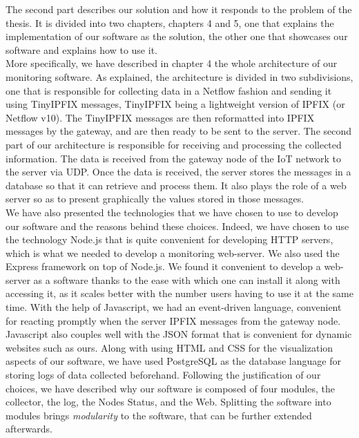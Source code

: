 The second part describes our solution and how it responds to the problem of the thesis. It is divided into two chapters, chapters 4 and 5, one that explains the implementation of our software as the solution, the other one that showcases our software and explains how to use it.\\

More specifically, we have described in chapter 4 the whole architecture of our monitoring software. As explained, the architecture is divided in two subdivisions, one that is responsible for collecting data in a Netflow fashion and sending it using TinyIPFIX messages, TinyIPFIX being a lightweight version of IPFIX (or Netflow v10). The TinyIPFIX messages are then reformatted into IPFIX messages by the gateway, and are then ready to be sent to the server. The second part of our architecture is responsible for receiving and processing the collected information. The data is received from the gateway node of the IoT network to the server via UDP. Once the data is received, the server stores the messages in a database so that it can retrieve and process them. It also plays the role of a web server so as to present graphically the values stored in those messages. \\

We have also presented the technologies that we have chosen to use to develop our software and the reasons behind these choices. Indeed, we have chosen to use the technology Node.js that is quite convenient for developing HTTP servers, which is what we needed to develop a monitoring web-server. We also used the Express framework on top of Node.js. We found it convenient to develop a web-server as a software thanks to the ease with which one can install it along with accessing it, as it scales better with the number users having to use it at the same time. With the help of Javascript, we had an event-driven language, convenient for reacting promptly when the server IPFIX messages from the gateway node. Javascript also couples well with the JSON format that is convenient for dynamic websites such as ours. Along with using HTML and CSS for the visualization aspects of our software, we have used PostgreSQL as the database language for storing logs of data collected beforehand. Following the justification of our choices, we have described why our software is composed of four modules, the collector, the log, the Nodes Status, and the Web. Splitting the software into modules brings \textit{modularity} to the software, that can be further extended afterwards.\\

